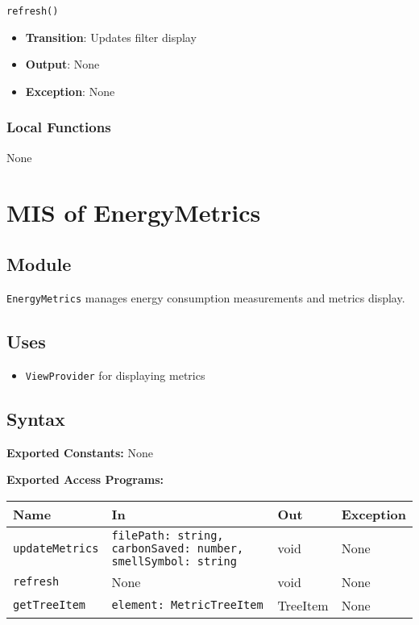 \documentclass[12pt, titlepage]{article}
\begin{document}
\texttt{refresh()}
\begin{itemize}
\item \textbf{Transition}: Updates filter display
\item \textbf{Output}: None
\item \textbf{Exception}: None
\end{itemize}

\subsubsection{Local Functions}
None

\section{MIS of EnergyMetrics}

\subsection{Module}
\texttt{EnergyMetrics} manages energy consumption measurements and metrics display.

\subsection{Uses}
\begin{itemize}
\item \texttt{ViewProvider} for displaying metrics
\end{itemize}

\subsection{Syntax}

\textbf{Exported Constants:} None

\textbf{Exported Access Programs:}\\
\begin{tabularx}{\linewidth}{|l|>{\raggedright\arraybackslash}X|l|l|}
  \hline
  \textbf{Name} & \textbf{In} & \textbf{Out} & \textbf{Exception} \\
  \hline
  \texttt{updateMetrics} & \texttt{filePath: string, carbonSaved: number, smellSymbol: string} & void & None \\ \hline
  \texttt{refresh} & None & void & None \\ \hline
  \texttt{getTreeItem} & \texttt{element: MetricTreeItem} & TreeItem & None \\
  \hline
\end{tabularx}
\end{document}
